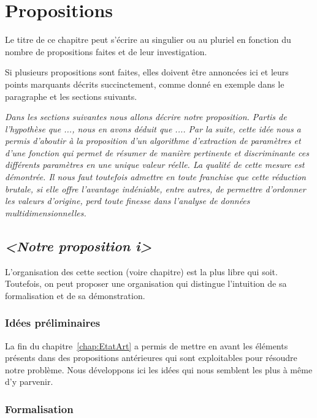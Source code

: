 \documentclass[11pt, french]{report-rd-info}
\begin{document}
\chapter{Propositions}
\label{chap:Propositions}

Le titre de ce chapitre peut s'écrire au singulier ou au pluriel en fonction du nombre de propositions faites et de leur investigation.

Si plusieurs propositions sont faites, elles doivent être annoncées ici et leurs points marquants décrits succinctement, comme donné en exemple dans le paragraphe et les sections suivants.

\bigskip

\emph{Dans les sections suivantes nous allons décrire notre proposition. Partis de l'hypothèse que ..., nous en avons déduit que .... Par la suite, cette idée nous a permis d'aboutir à la proposition d'un algorithme d'extraction de paramètres et d'une fonction qui permet de résumer de manière pertinente et discriminante ces différents paramètres en une unique valeur réelle. La qualité de cette mesure est démontrée. Il nous faut toutefois admettre en toute franchise que cette réduction brutale, si elle offre l'avantage indéniable, entre autres, de permettre d'ordonner les valeurs d'origine, perd toute finesse dans l'analyse de données multidimensionnelles.}

\section{\emph{<Notre proposition \textit{i}>}}

L'organisation des cette section (voire chapitre) est la plus libre qui soit. Toutefois, on peut proposer une organisation qui distingue l'intuition de sa formalisation et de sa démonstration.

\subsection{Idées préliminaires}

La fin du chapitre~\ref{chap:EtatArt} a permis de mettre en avant les éléments présents dans des propositions antérieures qui sont exploitables pour résoudre notre problème. Nous développons ici les idées qui nous semblent les plus à même d'y parvenir.

\subsection{Formalisation}
\end{document}
